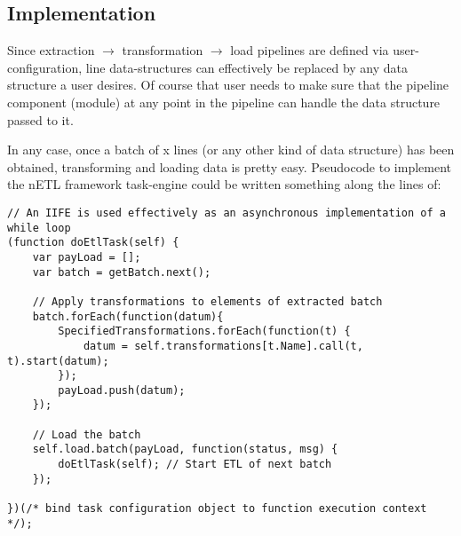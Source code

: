 \subsection{Implementation}
Since extraction \ensuremath{\rightarrow} transformation \ensuremath{\rightarrow} load pipelines are defined via user-configuration, line data-structures can effectively be replaced by any data structure a user desires. Of course that user needs to make sure that the pipeline component (module) at any point in the pipeline can handle the data structure passed to it.

In any case, once a batch of x lines (or any other kind of data structure) has been obtained, transforming and loading data is pretty easy. Pseudocode to implement the nETL framework task-engine could be written something along the lines of:

\begin{verbatim}
// An IIFE is used effectively as an asynchronous implementation of a while loop
(function doEtlTask(self) {
    var payLoad = [];
    var batch = getBatch.next();

    // Apply transformations to elements of extracted batch
    batch.forEach(function(datum){
        SpecifiedTransformations.forEach(function(t) {
            datum = self.transformations[t.Name].call(t, t).start(datum);
        });
        payLoad.push(datum);
    });

    // Load the batch
    self.load.batch(payLoad, function(status, msg) {
        doEtlTask(self); // Start ETL of next batch
    });

})(/* bind task configuration object to function execution context */);
\end{verbatim}